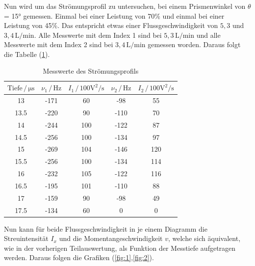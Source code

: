 \noindent
Nun wird um das Strömungsprofil zu untersuchen, bei einem Prismenwinkel von $\theta$ = 15° gemessen. Einmal bei einer Leistung von 70\% und einmal bei einer Leistung von 45\%.
Das entspricht etwas einer Flussgeschwindigkeit von $5,3$ und $3,4 \, \si{\liter\per\minute}$. Alle Messwerte mit dem Index 1 sind bei $5,3 \, \si{\liter\per\minute}$ und 
alle Messwerte mit dem Index 2 sind bei $3,4 \, \si{\liter\per\minute}$ gemessen worden. Daraus folgt die Tabelle (\ref{tab:profil}).

\begin{table}
    \centering
    \caption{Messwerte des Strömungsprofils}
    \begin{tabular}{c c c c c}
        \toprule

       {$\text{Tiefe}\, / \, \si{\micro\second}$} & {$\nu _1\, / \, \si{\hertz}$}& { $I_1 \, / \, 100\si{\volt\squared\per\second} $} & {$\nu_2 \, / \, \si{\hertz}$} & {$I_2 \, / \, 100\si{\volt\squared\per\second}$}\\
        \midrule
        13         &     -171    &        60   & -98   & 55  \\
        13.5       &     -220    &        90   & -110  & 70  \\
        14         &     -244    &        100  & -122  & 87  \\
        14.5       &     -256    &        100  & -134  & 97  \\
        15         &     -269    &        104  & -146  & 120  \\
        15.5       &     -256    &        100  & -134  & 114  \\
        16         &     -232    &        105  & -122  & 116  \\
        16.5       &     -195    &        101  & -110  & 88  \\
        17         &     -159    &        90   & -98    & 49  \\
        17.5       &     -134    &        60   & 0      & 0  \\
        \bottomrule
    \end{tabular}
    \label{tab:profil}
\end{table}

\noindent
Nun kann für beide Flussgeschwindigkeit in je einem Diagramm die Streuintensität $I_x$ und die Momentangeschwindigkeit $v$, welche sich äquivalent, wie in der vorherigen 
Teilauswertung, als Funktion der Messtiefe aufgetragen werden. Daraus folgen die Grafiken (\ref{fig:1},\ref{fig:2}).

